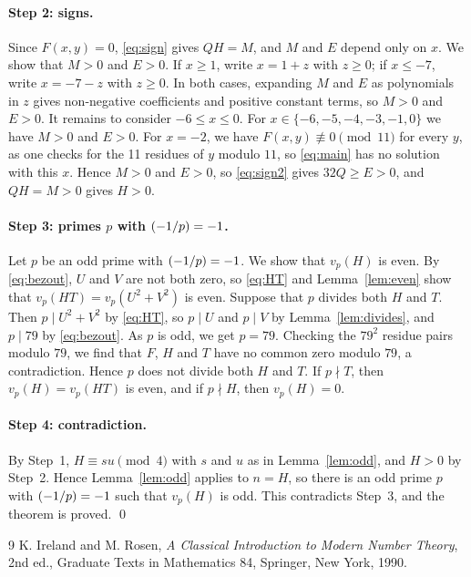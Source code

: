 \documentclass[11pt]{article}
\newcommand{\leg}[2]{\mathchoice{\biggl(\dfrac{#1}{#2}\biggr)}{(#1/#2)}{(#1/#2)}{(#1/#2)}}
\begin{document}
\paragraph{Step 2: signs.} Since $F(x,y)=0$, \eqref{eq:sign} gives $QH=M$, and $M$ and $E$ depend only on $x$. We show that $M>0$ and $E>0$. If $x\geq1$, write $x=1+z$ with $z\geq0$; if $x\leq-7$, write $x=-7-z$ with $z\geq0$. In both cases, expanding $M$ and $E$ as polynomials in $z$ gives non-negative coefficients and positive constant terms, so $M>0$ and $E>0$. It remains to consider $-6\leq x\leq0$. For $x\in\{-6,-5,-4,-3,-1,0\}$ we have $M>0$ and $E>0$. For $x=-2$, we have $F(x,y)\not\equiv0\pmod{11}$ for every $y$, as one checks for the 11 residues of $y$ modulo $11$, so \eqref{eq:main} has no solution with this $x$. Hence $M>0$ and $E>0$, so \eqref{eq:sign2} gives $32Q\geq E>0$, and $QH=M>0$ gives $H>0$.

\paragraph{\texorpdfstring{Step 3: primes $p$ with $\leg{-1}{p}=-1$.}{Step 3: inert primes.}} Let $p$ be an odd prime with $\leg{-1}{p}=-1$. We show that $v_p(H)$ is even. By \eqref{eq:bezout}, $U$ and $V$ are not both zero, so \eqref{eq:HT} and Lemma~\ref{lem:even} show that $v_p(HT)=v_p(U^2+V^2)$ is even. Suppose that $p$ divides both $H$ and $T$. Then $p\mid U^2+V^2$ by \eqref{eq:HT}, so $p\mid U$ and $p\mid V$ by Lemma~\ref{lem:divides}, and $p\mid 79$ by \eqref{eq:bezout}. As $p$ is odd, we get $p=79$. Checking the $79^2$ residue pairs modulo $79$, we find that $F$, $H$ and $T$ have no common zero modulo $79$, a contradiction. Hence $p$ does not divide both $H$ and $T$. If $p\nmid T$, then $v_p(H)=v_p(HT)$ is even, and if $p\nmid H$, then $v_p(H)=0$.

\paragraph{Step 4: contradiction.} By Step~1, $H\equiv su\pmod{4}$ with $s$ and $u$ as in Lemma~\ref{lem:odd}, and $H>0$ by Step~2. Hence Lemma~\ref{lem:odd} applies to $n=H$, so there is an odd prime $p$ with $\leg{-1}{p}=-1$ such that $v_p(H)$ is odd. This contradicts Step~3, and the theorem is proved.
\qed

\begin{thebibliography}{9}
 K. Ireland and M. Rosen, \emph{A Classical Introduction to Modern Number Theory}, 2nd ed., Graduate Texts in Mathematics 84, Springer, New York, 1990.
\end{thebibliography}
\end{document}
